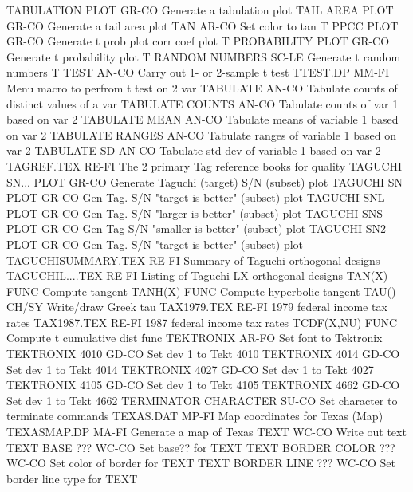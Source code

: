 TABULATION PLOT             GR-CO Generate a tabulation plot
TAIL AREA PLOT              GR-CO Generate a tail area plot
TAN                         AR-CO Set color to tan
T PPCC PLOT                 GR-CO Generate t prob plot corr coef plot
T PROBABILITY PLOT          GR-CO Generate t probability plot
T RANDOM NUMBERS            SC-LE Generate t random numbers
T TEST                      AN-CO Carry out 1- or 2-sample t test
TTEST.DP                    MM-FI Menu macro to perfrom t test on 2 var
TABULATE                    AN-CO Tabulate counts of distinct values of a var
TABULATE COUNTS             AN-CO Tabulate counts of var 1 based on var 2
TABULATE MEAN               AN-CO Tabulate means of variable 1 based on var 2
TABULATE RANGES             AN-CO Tabulate ranges of variable 1 based on var 2
TABULATE SD                 AN-CO Tabulate std dev of variable 1 based on var 2
TAGREF.TEX                  RE-FI The 2 primary Tag reference books for quality
TAGUCHI SN... PLOT          GR-CO Generate Taguchi (target) S/N (subset) plot
TAGUCHI SN PLOT             GR-CO Gen Tag. S/N "target is better" (subset) plot
TAGUCHI SNL PLOT            GR-CO Gen Tag. S/N "larger is better" (subset) plot
TAGUCHI SNS PLOT            GR-CO Gen Tag S/N "smaller is better" (subset) plot
TAGUCHI SN2 PLOT            GR-CO Gen Tag. S/N "target is better" (subset) plot
TAGUCHISUMMARY.TEX          RE-FI Summary of Taguchi orthogonal designs
TAGUCHIL....TEX             RE-FI Listing of Taguchi LX orthogonal designs
TAN(X)                      FUNC  Compute tangent
TANH(X)                     FUNC  Compute hyperbolic tangent
TAU()                       CH/SY Write/draw Greek tau
TAX1979.TEX                 RE-FI 1979 federal income tax rates
TAX1987.TEX                 RE-FI 1987 federal income tax rates
TCDF(X,NU)                  FUNC  Compute t cumulative dist func
TEKTRONIX                   AR-FO Set font to Tektronix
TEKTRONIX 4010              GD-CO Set dev 1 to Tekt 4010
TEKTRONIX 4014              GD-CO Set dev 1 to Tekt 4014
TEKTRONIX 4027              GD-CO Set dev 1 to Tekt 4027
TEKTRONIX 4105              GD-CO Set dev 1 to Tekt 4105
TEKTRONIX 4662              GD-CO Set dev 1 to Tekt 4662
TERMINATOR CHARACTER        SU-CO Set character to terminate commands
TEXAS.DAT                   MP-FI Map coordinates for Texas (Map)
TEXASMAP.DP                 MA-FI Generate a map of Texas
TEXT                        WC-CO Write out text
TEXT BASE              ???  WC-CO Set base?? for TEXT
TEXT BORDER COLOR      ???  WC-CO Set color of border for TEXT
TEXT BORDER LINE       ???  WC-CO Set border line type for TEXT
